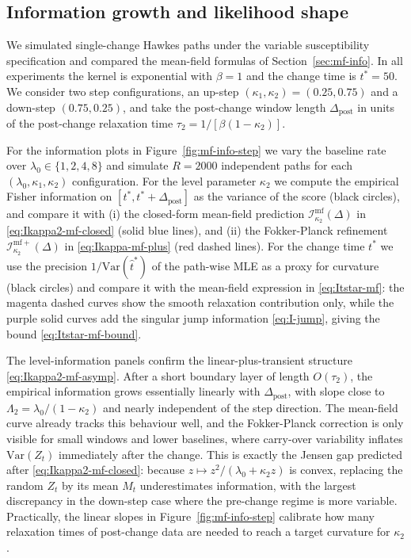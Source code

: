 \documentclass{article}
\theoremstyle{plain}
\theoremstyle{definition}
\newcommand{\Var}{\mathrm{Var}}
\newcommand{\1}{\mathbf{1}}
\begin{document}
\subsection{Information growth and likelihood shape}
\label{sec:mf-sim}

We simulated single-change Hawkes paths under the variable susceptibility specification and compared the mean-field formulas of Section~\ref{sec:mf-info}. In all experiments the kernel is exponential with $\beta=1$ and the change time is $t^\ast=50$. We consider two step configurations, an up-step $(\kappa_1,\kappa_2)=(0.25,0.75)$ and a down-step $(0.75,0.25)$, and take the post-change window length $\Delta_{\text{post}}$ in units of the post-change relaxation time $\tau_2=1/[\beta(1-\kappa_2)]$.

For the information plots in Figure~\ref{fig:mf-info-step} we vary the baseline rate over $\lambda_0\in\{1,2,4,8\}$ and simulate $R=2000$ independent paths for each $(\lambda_0,\kappa_1,\kappa_2)$ configuration. For the level parameter $\kappa_2$ we compute the empirical Fisher information on $[t^\ast,t^\ast+\Delta_{\text{post}}]$ as the variance of the score (black circles), and compare it with (i) the closed-form mean-field prediction $\mathcal I_{\kappa_2}^{\mathrm{mf}}(\Delta)$ in \eqref{eq:Ikappa2-mf-closed} (solid blue lines), and (ii) the Fokker-Planck refinement $\mathcal I_{\kappa_2}^{\mathrm{mf+}}(\Delta)$ in \eqref{eq:Ikappa-mf-plus} (red dashed lines). For the change time $t^\ast$ we use the precision $1/\Var(\hat t^\ast)$ of the path-wise MLE as a proxy for curvature (black circles) and compare it with the mean-field expression in \eqref{eq:Itstar-mf}: the magenta dashed curves show the smooth relaxation contribution only, while the purple solid curves add the singular jump information \eqref{eq:I-jump}, giving the bound \eqref{eq:Itstar-mf-bound}.


The level-information panels confirm the linear-plus-transient structure \eqref{eq:Ikappa2-mf-asymp}. After a short boundary layer of length $O(\tau_2)$, the empirical information grows essentially linearly with $\Delta_{\text{post}}$, with slope close to $\Lambda_2=\lambda_0/(1-\kappa_2)$ and nearly independent of the step direction. The mean-field curve already tracks this behaviour well, and the Fokker-Planck correction is only visible for small windows and lower baselines, where carry-over variability inflates $\Var(Z_t)$ immediately after the change. This is exactly the Jensen gap predicted after \eqref{eq:Ikappa2-mf-closed}: because $z\mapsto z^2/(\lambda_0+\kappa_2 z)$ is convex, replacing the random $Z_t$ by its mean $M_t$ underestimates information, with the largest discrepancy in the down-step case where the pre-change regime is more variable. Practically, the linear slopes in Figure~\ref{fig:mf-info-step} calibrate how many relaxation times of post-change data are needed to reach a target curvature for $\kappa_2$.
\end{document}
